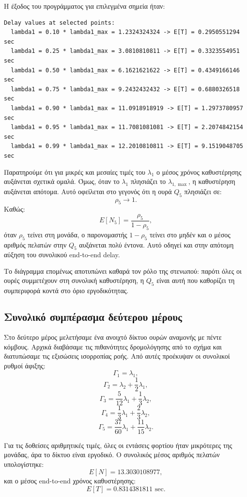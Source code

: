 \documentclass{article}
\begin{document}
Η έξοδος του προγράμματος για επιλεγμένα σημεία ήταν:

\begin{verbatim}
Delay values at selected points:
  lambda1 = 0.10 * lambda1_max = 1.2324324324 -> E[T] = 0.2950551294 sec
  lambda1 = 0.25 * lambda1_max = 3.0810810811 -> E[T] = 0.3323554951 sec
  lambda1 = 0.50 * lambda1_max = 6.1621621622 -> E[T] = 0.4349166146 sec
  lambda1 = 0.75 * lambda1_max = 9.2432432432 -> E[T] = 0.6880326518 sec
  lambda1 = 0.90 * lambda1_max = 11.0918918919 -> E[T] = 1.2973780957 sec
  lambda1 = 0.95 * lambda1_max = 11.7081081081 -> E[T] = 2.2074842154 sec
  lambda1 = 0.99 * lambda1_max = 12.2010810811 -> E[T] = 9.1519048705 sec
\end{verbatim}

Παρατηρούμε ότι για μικρές και μεσαίες τιμές του $\lambda_1$ ο μέσος χρόνος καθυστέρησης αυξάνεται σχετικά ομαλά. Όμως, όταν το $\lambda_1$ πλησιάζει το $\lambda_{1,\max}$, η καθυστέρηση αυξάνεται απότομα. Αυτό οφείλεται στο γεγονός ότι η ουρά $Q_5$ πλησιάζει σε:
\[
    \rho_5 \to 1.
\]
Καθώς:
\[
    E[N_5] = \frac{\rho_5}{1-\rho_5},
\]
όταν $\rho_5$ τείνει στη μονάδα, ο παρονομαστής $1-\rho_5$ τείνει στο μηδέν και ο μέσος αριθμός πελατών στην $Q_5$ αυξάνεται πολύ έντονα. Αυτό οδηγεί και στην απότομη αύξηση του συνολικού end-to-end delay.

Το διάγραμμα επομένως αποτυπώνει καθαρά τον ρόλο της στενωπού: παρότι όλες οι ουρές συμμετέχουν στη συνολική καθυστέρηση, η $Q_5$ είναι αυτή που καθορίζει τη συμπεριφορά κοντά στο όριο εργοδικότητας.

\subsection{Συνολικό συμπέρασμα δεύτερου μέρους}

Στο δεύτερο μέρος μελετήσαμε ένα ανοιχτό δίκτυο ουρών αναμονής με πέντε κόμβους. Αρχικά διαβάσαμε τις πιθανότητες δρομολόγησης από το σχήμα και διατυπώσαμε τις εξισώσεις ισορροπίας ροής. Από αυτές προέκυψαν οι συνολικοί ρυθμοί άφιξης:
\[
    \Gamma_1 = \lambda_1,
\]
\[
    \Gamma_2 = \lambda_2 + \frac{1}{2}\lambda_1,
\]
\[
    \Gamma_3 = \frac{5}{12}\lambda_1 + \frac{1}{3}\lambda_2,
\]
\[
    \Gamma_4 = \frac{1}{3}\lambda_1 + \frac{2}{3}\lambda_2,
\]
\[
    \Gamma_5 = \frac{37}{60}\lambda_1 + \frac{11}{15}\lambda_2.
\]

Για τις δοθείσες αριθμητικές τιμές, όλες οι εντάσεις φορτίου ήταν μικρότερες της μονάδας, άρα το δίκτυο είναι εργοδικό. Ο συνολικός μέσος αριθμός πελατών υπολογίστηκε:
\[
    E[N] = 13.3030108977,
\]
και ο μέσος end-to-end χρόνος καθυστέρησης:
\[
    E[T] = 0.8314381811 \text{ sec}.
\]
\end{document}
